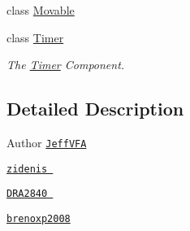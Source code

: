 \begin{DoxyCompactItemize}
class \hyperlink{classbr_1_1unb_1_1unbomber_1_1component_1_1_movable}{Movable}
\item 
class \hyperlink{classbr_1_1unb_1_1unbomber_1_1component_1_1_timer}{Timer}
\begin{DoxyCompactList}\small\item\em The \hyperlink{classbr_1_1unb_1_1unbomber_1_1component_1_1_timer}{Timer} Component. \end{DoxyCompactList}\end{DoxyCompactItemize}


\subsection{Detailed Description}
\begin{DoxyAuthor}{Author}
 \href{https://github.com/JeffVFA}{\tt Jeff\+V\+F\+A} 

 \href{https://github.com/zidenis}{\tt zidenis } 

 \href{https://github.com/DRA2840}{\tt D\+R\+A2840 } 

 \href{https://github.com/brenoxp2008}{\tt brenoxp2008} 
\end{DoxyAuthor}
